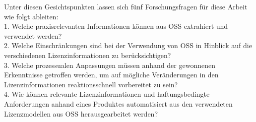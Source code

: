 Unter diesen Gesichtspunkten lassen sich fünf Forschungsfragen für diese Arbeit wie folgt ableiten:\\ 

1. Welche praxisrelevanten Informationen können aus OSS extrahiert und verwendet werden?\\ 



2. Welche Einschränkungen sind bei der Verwendung von OSS in Hinblick auf die verschiedenen Lizenzinformationen zu berücksichtigen?\\ 



3. Welche prozessualen Anpassungen müssen anhand der gewonnenen Erkenntnisse getroffen werden, um auf mögliche Veränderungen in den Lizenzinformationen reaktionsschnell vorbereitet zu sein?\\ 








4. Wie können relevante Lizenzinformationen und haftungsbedingte Anforderungen anhand eines Produktes automatisiert aus den verwendeten Lizenzmodellen aus OSS herausgearbeitet werden?\\ 

